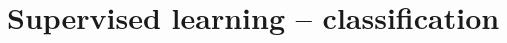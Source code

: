 \newpage\section{Supervised learning – classification} \label{section: – Supervised learning – classification}
\hrulefill  %